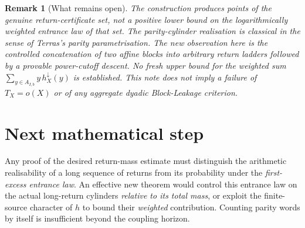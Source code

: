 \documentclass[11pt,a4paper]{article}
\newtheorem{remark}[theorem]{Remark}
\begin{document}
\begin{remark}[What remains open]
The construction produces \emph{points} of the genuine
return-certificate set, not a positive lower bound on the
\emph{logarithmically weighted entrance law} of that set. The
parity-cylinder realisation is classical in the sense of
Terras's parity parametrisation. The new observation here is the
controlled concatenation of two affine blocks into arbitrary
return ladders followed by a \emph{provable} power-cutoff descent.
No fresh upper bound for the weighted sum
$\sum_{y\in A_{I,b}}y\,h_X^\downarrow(y)$ is established.
This note does not imply a failure of $T_X=o(X)$ or of any
aggregate dyadic Block-Leakage criterion.
\end{remark}

\section*{Next mathematical step}
Any proof of the desired return-mass estimate must distinguish the
arithmetic realisability of a long sequence of returns from its
probability under the \emph{first-excess entrance law}.
An effective new theorem would control this entrance law on the
actual long-return cylinders \emph{relative to its total mass},
or exploit the finite-source character of $h$ to bound their
\emph{weighted} contribution. Counting parity words by itself
is insufficient beyond the coupling horizon.
\end{document}
